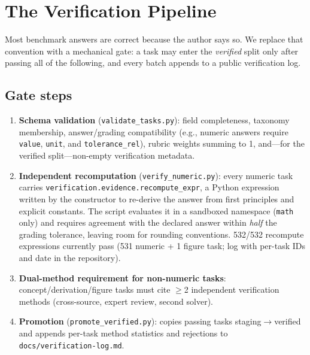 \section{The Verification Pipeline}
\label{sec:verification}

Most benchmark answers are correct because the author says so. We replace that convention with a mechanical gate: a task may enter the \emph{verified} split only after passing all of the following, and every batch appends to a public verification log.

\subsection{Gate steps}
\begin{enumerate}
    \item \textbf{Schema validation} (\texttt{validate\_tasks.py}): field completeness, taxonomy membership, answer/grading compatibility (e.g., numeric answers require \texttt{value}, \texttt{unit}, and \texttt{tolerance\_rel}), rubric weights summing to 1, and---for the verified split---non-empty verification metadata.
    \item \textbf{Independent recomputation} (\texttt{verify\_numeric.py}): every numeric task carries \texttt{verification.evidence.recompute\_expr}, a Python expression written by the constructor to re-derive the answer from first principles and explicit constants. The script evaluates it in a sandboxed namespace (\texttt{math} only) and requires agreement with the declared answer within \emph{half} the grading tolerance, leaving room for rounding conventions. 532/532 recompute expressions currently pass (531 numeric + 1 figure task; log with per-task IDs and date in the repository).
    \item \textbf{Dual-method requirement for non-numeric tasks}: concept/derivation/figure tasks must cite $\geq$2 independent verification methods (cross-source, expert review, second solver).
    \item \textbf{Promotion} (\texttt{promote\_verified.py}): copies passing tasks staging$\rightarrow$verified and appends per-task method statistics and rejections to \texttt{docs/verification-log.md}.
\end{enumerate}

